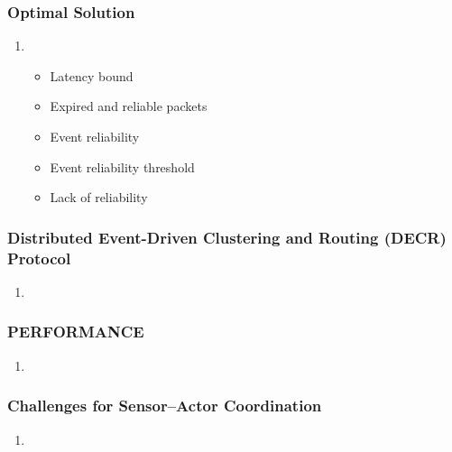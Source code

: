 \documentclass[11pt]{class}
\begin{document}
									\begin{frame}
										\frametitle{Optimal Solution}
										\begin{enumerate}
											\item 
											\begin{itemize}
												\item Latency bound
												\item Expired and reliable packets
												\item Event reliability
												\item Event reliability threshold
												\item Lack of reliability
											\end{itemize}
										\end{enumerate}
									\end{frame}
									
										\begin{frame}
											\frametitle{Distributed Event-Driven Clustering and Routing (DECR) Protocol}
											\begin{enumerate}
												\item 
											\end{enumerate}
										\end{frame}
										
										\begin{frame}
											\frametitle{PERFORMANCE}
											\begin{enumerate}
												\item 
											\end{enumerate}
										\end{frame}
											\begin{frame}
												\frametitle{Challenges for Sensor–Actor Coordination}
												\begin{enumerate}
													\item 
												\end{enumerate}
											\end{frame}
										
\end{document}
